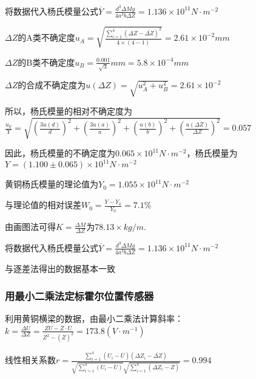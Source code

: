 \documentclass[12pt,a4paper]{article}
\begin{document}
        
        将数据代入杨氏模量公式$\overline Y  = \frac{{{d^3}\Delta Mg}}{{4{a^3}b\Delta Z}} = 1.136 \times {10^{11}}N \cdot {m^{ - 2}}$\par
        $\Delta Z$的A类不确定度${u_A} = \sqrt {\frac{{{{\sum\limits_{i = 1}^4 {\left( {\Delta Z - \overline {\Delta Z} } \right)} }^2}}}{{4 \times \left( {4 - 1} \right)}}}  = 2.61 \times {10^{ - 2}}mm$\par
        $\Delta Z$的B类不确定度${u_B} = \frac{{0.001}}{{\sqrt 3 }}mm = 5.8 \times {10^{ - 4}}mm$\par
        $\Delta Z$的合成不确定度为$u\left( {\Delta Z} \right) = \sqrt {u_A^2 + u_B^2}  = 2.61\times {10^{ - 2}}$\par
        所以，杨氏模量的相对不确定度为$\frac{{{u_Y}}}{Y} = \sqrt {{{\left( {\frac{{3u\left( d \right)}}{d}} \right)}^2} + {{\left( {\frac{{3u\left( a \right)}}{a}} \right)}^2} + {{\left( {\frac{{u\left( b \right)}}{b}} \right)}^2} + {{\left( {\frac{{u\left( {\Delta Z} \right)}}{{\Delta Z}}} \right)}^2}}  = 0.057$\par
        因此，杨氏模量的不确定度为$0.065 \times {10^{ 11}}N \cdot {m^{ - 2}}$，杨氏模量为$Y = \left( {1.100 \pm 0.065} \right) \times {10^{ 11}}N \cdot {m^{ - 2}}$\par
        黄铜杨氏模量的理论值为${Y_0} = 1.055 \times {10^{11}}N \cdot {m^{ - 2}}$\par
        与理论值的相对误差${W_0} = \frac{{Y - {Y_0}}}{{{Y_0}}} = 7.1\% $


        由画图法可得$K = \frac{\Delta M}{\Delta Z}$为$ 78.13 \times  kg/m$.\par
        将数据代入杨氏模量公式$\overline Y  = \frac{{{d^3}\Delta Mg}}{{4{a^3}b\Delta Z}} = 1.136 \times {10^{11}}N \cdot {m^{ - 2}}$\par
        与逐差法得出的数据基本一致
    
        \subsubsection{用最小二乘法定标霍尔位置传感器}
        利用黄铜横梁的数据，由最小二乘法计算斜率：$k = \frac{{\Delta U}}{{\Delta Z}} = \frac{{\overline {ZU}  - \overline Z  \cdot \overline U }}{{\overline {{Z^2}}  - {{\left( {\overline Z } \right)}^2}}} = 173.8\left( {V \cdot {m^{ - 1}}} \right)$\par
        线性相关系数$r = \frac{{\sum\limits_{i = 1}^4 {\left( {{U_i} - \overline U } \right)\left( {\Delta {Z_i} - \overline {\Delta Z} } \right)} }}{{\sqrt {\sum\limits_{i = 1}^4 {\left( {{U_i} - U} \right)} } \sqrt {\sum\limits_{i = 1}^4 {\left( {\Delta {Z_i} - \overline Z } \right)} } }} = 0.994$\par
       
\end{document}
